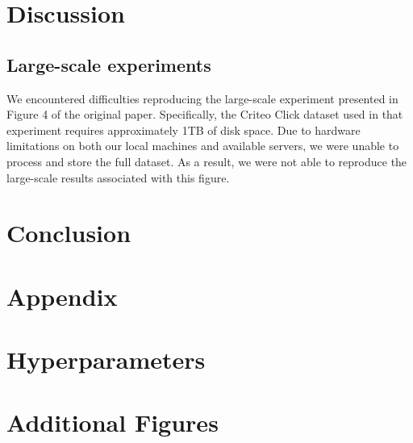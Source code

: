 \documentclass[a4paper,twocolumn]{article} %
\begin{document}
\section{Discussion}


\subsection{ Large-scale experiments}
We encountered difficulties reproducing the large-scale experiment presented in Figure 4 of the original paper. Specifically, the Criteo Click dataset used in that experiment requires approximately 1TB of disk space. 
Due to hardware limitations on both our local machines and available servers, we were unable to process and store the full dataset. 
As a result, we were not able to reproduce the large-scale results associated with this figure.

\section{Conclusion}





\clearpage
\appendix
\section*{Appendix}
\section{Hyperparameters}

\section{Additional Figures}
\end{document}

